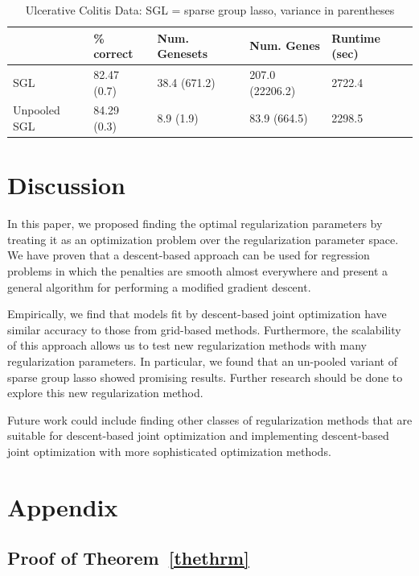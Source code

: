 \documentclass[10pt,letterpaper]{article}
\begin{document}
\begin{table}
\begin{center}
\begin{tabular}{| l | l | l | l | l | }
\hline
 & \% correct  & Num. Genesets & Num. Genes & Runtime (sec) \\
\hline
SGL & 82.47 (0.7) & 38.4 (671.2) & 207.0 (22206.2) & 2722.4 \\
\hline
Unpooled SGL & 84.29 (0.3) & 8.9 (1.9) & 83.9 (664.5) & 2298.5 \\
\hline
\end{tabular}
\end{center}
\caption {Ulcerative Colitis Data: SGL = sparse group lasso, variance in parentheses}
\label{colitis}
\end{table}

\section{Discussion}
In this paper, we proposed finding the optimal regularization parameters by treating it as an optimization problem over the regularization parameter space. We have proven that a descent-based approach can be used for regression problems in which the penalties are smooth almost everywhere and present a general algorithm for performing a modified gradient descent.

Empirically, we find that models fit by descent-based joint optimization have similar accuracy to those from grid-based methods. Furthermore, the scalability of this approach allows us to test new regularization methods with many regularization parameters. In particular, we found that an un-pooled variant of sparse group lasso showed promising results. Further research should be done to explore this new regularization method.

Future work could include finding other classes of regularization methods that are suitable for descent-based joint optimization and implementing descent-based joint optimization with more sophisticated optimization methods.

\section{Appendix}

\subsection{Proof of Theorem~\ref{thethrm}}
\end{document}
